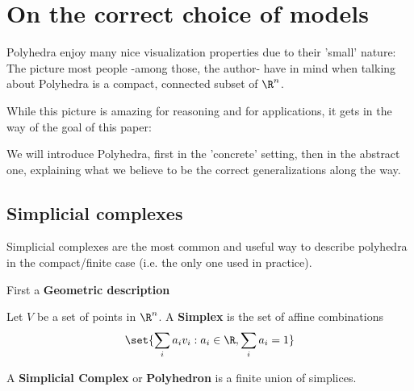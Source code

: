 \section{On the correct choice of models}
Polyhedra enjoy many nice visualization properties due to their 'small' nature:
The picture most people -among those, the author- have in mind when talking about Polyhedra
is a compact, connected subset of $\R^n$.

While this picture is amazing for reasoning and for applications, it gets in the way of the goal of this paper:

We will introduce Polyhedra, first in the 'concrete' setting, then in the abstract one, explaining what we believe to be the correct 
generalizations along the way.
\subsection{Simplicial complexes}
Simplicial complexes are the most common and useful way to describe polyhedra in the compact/finite case (i.e. the only one used in practice).

First a \textbf{Geometric description}
\begin{definition}\hfill 

    Let $V$ be a set of points in $\R^n$. A \textbf{Simplex} is the set of affine combinations 
    \[\set{\sum_{i}a_iv_i: a_i\in\R, \sum_i a_i=1}\]
    
    A \textbf{Simplicial Complex} or \textbf{Polyhedron} is a finite union of simplices.
\end{definition}


